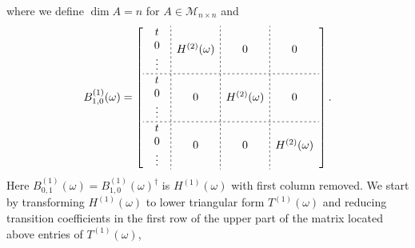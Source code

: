 \documentclass{article}
\begin{document}
where we define $\dim A = n$ for $A\in\mathcal{M}_{n \times n}$ and
\begin{equation}
    B^{(1)}_{1,0}(\omega) = \left[
        \begin{array}{c;{2pt/2pt}c;{2pt/2pt}c;{2pt/2pt}c}
                \begin{array}{c} t \\ 0 \\ \vdots \end{array} 
                & H^{(2)}(\omega) & 0 & 0 \\
                \hdashline[2pt/2pt]
                \begin{array}{c} t \\ 0 \\ \vdots \end{array}
                & 0 & H^{(2)}(\omega) & 0  \\
                \hdashline[2pt/2pt]
                \begin{array}{c} t \\ 0 \\ \vdots \end{array}
                & 0 & 0 & H^{(2)}(\omega)
    \end{array} \right].
\end{equation}
Here $B^{(1)}_{0,1}(\omega) = B^{(1)}_{1,0}(\omega)^\dag$ is $H^{(1)}(\omega)$ with first column removed. We start by transforming $H^{(1)}(\omega)$ to lower triangular form $T^{(1)}(\omega)$ and reducing transition coefficients in the first row of the upper part of the matrix located above entries of $T^{(1)}(\omega)$,
\end{document}
